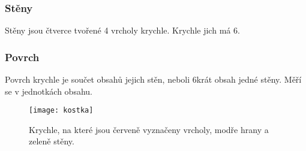 \subsubsection{Stěny}
Stěny jsou čtverce tvořené 4 vrcholy krychle. Krychle jich má 6.
\subsubsection{Povrch}
Povrch krychle je součet obsahů jejich stěn, neboli 6krát obsah jedné stěny. Měří se v jednotkách obsahu.

\begin{figure}[h]
	\caption{Krychle, na které jsou červeně vyznačeny vrcholy, modře hrany a zeleně stěny.}
	\centering
	\texttt{[image: kostka]}
\end{figure}


